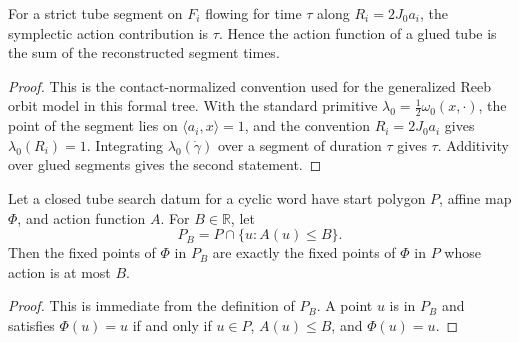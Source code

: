\begin{unverified}
\begin{lemma}\label{lem:fg-action-normalization}
For a strict tube segment on \(F_i\) flowing for time \(\tau\) along
\(R_i=2J_0a_i\), the symplectic action contribution is \(\tau\).  Hence the
action function of a glued tube is the sum of the reconstructed segment times.
\end{lemma}

\begin{proof}
This is the contact-normalized convention used for the generalized Reeb orbit
model in this formal tree.  With the standard primitive
\(\lambda_0=\frac12\omega_0(x,\cdot)\), the point of the segment lies on
\(\langle a_i,x\rangle=1\), and the convention \(R_i=2J_0a_i\) gives
\(\lambda_0(R_i)=1\).  Integrating \(\lambda_0(\dot\gamma)\) over a segment of
duration \(\tau\) gives \(\tau\).  Additivity over glued segments gives the
second statement.
\end{proof}
\end{unverified}

\begin{unverified}
\begin{lemma}%
\label{lem:fg-action-cutoff-preserves-below-cutoff-fixed-points}
Let a closed tube search datum for a cyclic word have start polygon \(P\),
affine map \(\Phi\), and action function \(A\).  For \(B\in\mathbb R\), let
\[
  P_B=P\cap\{u:A(u)\le B\}.
\]
Then the fixed points of \(\Phi\) in \(P_B\) are exactly the fixed points of
\(\Phi\) in \(P\) whose action is at most \(B\).
\end{lemma}

\begin{proof}
This is immediate from the definition of \(P_B\).  A point \(u\) is in \(P_B\)
and satisfies \(\Phi(u)=u\) if and only if \(u\in P\), \(A(u)\le B\), and
\(\Phi(u)=u\).
\end{proof}
\end{unverified}

